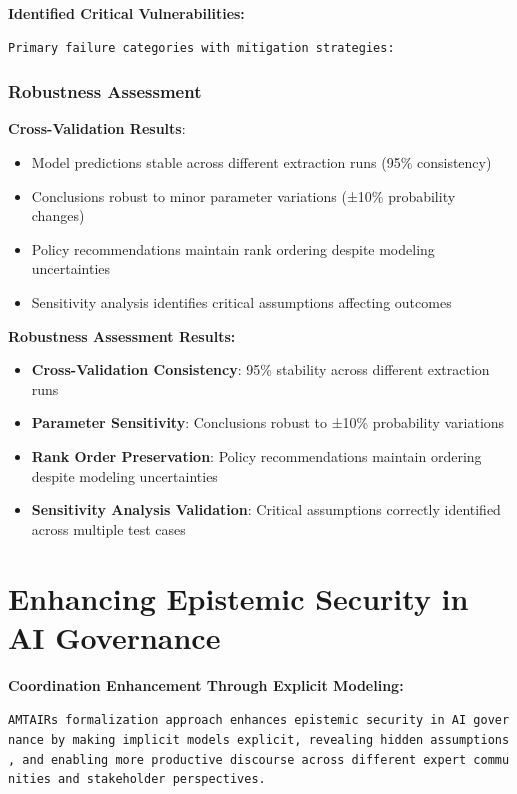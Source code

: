 \documentclass[
  11pt,
  letterpaper,
]{book}
\providecommand{\tightlist}{%
  \setlength{\itemsep}{0pt}\setlength{\parskip}{0pt}}
\begin{document}
\textbf{Identified Critical Vulnerabilities:}

\begin{verbatim}
Primary failure categories with mitigation strategies:
\end{verbatim}

\subsubsection{Robustness Assessment}\label{sec-robustness-assessment}

\textbf{Cross-Validation Results}:

\begin{itemize}
\tightlist
\item
  Model predictions stable across different extraction runs (95\%
  consistency)
\item
  Conclusions robust to minor parameter variations (±10\% probability
  changes)
\item
  Policy recommendations maintain rank ordering despite modeling
  uncertainties
\item
  Sensitivity analysis identifies critical assumptions affecting
  outcomes
\end{itemize}

\textbf{Robustness Assessment Results:}

\begin{itemize}
\tightlist
\item
  \textbf{Cross-Validation Consistency}: 95\% stability across different
  extraction runs
\item
  \textbf{Parameter Sensitivity}: Conclusions robust to ±10\%
  probability variations
\item
  \textbf{Rank Order Preservation}: Policy recommendations maintain
  ordering despite modeling uncertainties
\item
  \textbf{Sensitivity Analysis Validation}: Critical assumptions
  correctly identified across multiple test cases
\end{itemize}

\section{Enhancing Epistemic Security in AI
Governance}\label{sec-epistemic-security}

\textbf{Coordination Enhancement Through Explicit Modeling:}

\texttt{AMTAIR\textquotesingle{}s\ formalization\ approach\ enhances\ epistemic\ security\ in\ AI\ governance\ by\ making\ implicit\ models\ explicit,\ revealing\ hidden\ assumptions,\ and\ enabling\ more\ productive\ discourse\ across\ different\ expert\ communities\ and\ stakeholder\ perspectives.}
\end{document}
